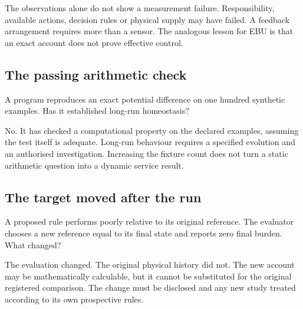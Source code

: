 The observations alone do not show a measurement failure. Responsibility, available actions, decision rules or physical supply may have failed. A feedback arrangement requires more than a sensor. The analogous lesson for EBU is that an exact account does not prove effective control.

\subsection{The passing arithmetic check}
A program reproduces an exact potential difference on one hundred synthetic examples. Has it established long-run homeostasis?

No. It has checked a computational property on the declared examples, assuming the test itself is adequate. Long-run behaviour requires a specified evolution and an authorised investigation. Increasing the fixture count does not turn a static arithmetic question into a dynamic service result.

\subsection{The target moved after the run}
A proposed rule performs poorly relative to its original reference. The evaluator chooses a new reference equal to its final state and reports zero final burden. What changed?

The evaluation changed. The original physical history did not. The new account may be mathematically calculable, but it cannot be substituted for the original registered comparison. The change must be disclosed and any new study treated according to its own prospective rules.
